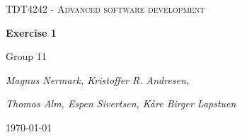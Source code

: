 \documentclass{article}
\begin{document}
\begin{titlepage}
	\centering
	{\scshape\huge TDT4242 - Advanced software development\par}
	\vspace{1.5cm}
	{\huge\bfseries Exercise 1\par}
	\vspace{2cm}
	{\Large Group 11\par}
	{\Large\itshape Magnus Nermark, Kristoffer R. Andresen,\par}
	{\Large\itshape Thomas Alm, Espen Sivertsen, Kåre Birger Lapstuen\par}


	\vfill
	


	{\large \today\par}
\end{titlepage}
\tableofcontents
\newpage


\end{document}

